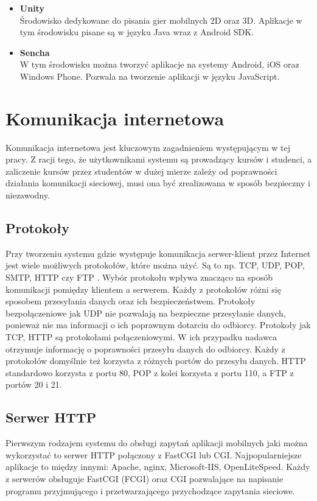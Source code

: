 \documentclass[eng]{mgr}
\begin{document}
\begin{itemize}
				\item \textbf{Unity}\\
				Środowisko dedykowane do pisania gier mobilnych 2D oraz 3D. Aplikacje w tym środowisku pisane są w języku Java wraz z Android SDK.
				
				\item \textbf{Sencha}\\
				W tym środowisku można tworzyć aplikacje na systemy Android, iOS oraz Windows Phone. Pozwala na tworzenie aplikacji w języku JavaScript.
				
			\end{itemize}
	
		\section{Komunikacja internetowa}
		Komunikacja internetowa jest kluczowym zagadnieniem występującym w tej pracy. Z racji tego, że użytkownikami systemu są prowadzący kursów i studenci, a zaliczenie kursów przez studentów w dużej mierze zależy od poprawności działania komunikacji sieciowej, musi ona być zrealizowana w sposób bezpieczny i niezawodny.
		
			\subsection{Protokoły}
			Przy tworzeniu systemu gdzie występuje komunikacja serwer-klient przez Internet jest wiele możliwych protokołów, które można użyć. Są to np. TCP, UDP, POP, SMTP, HTTP czy FTP \cite{protocols}. Wybór protokołu wpływa znacząco na sposób komunikacji pomiędzy klientem a serwerem. Każdy z protokołów różni się sposobem przesyłania danych oraz ich bezpieczeństwem. Protokoły bezpołączeniowe jak UDP nie pozwalają na bezpieczne przesyłanie danych, ponieważ nie ma informacji o ich poprawnym dotarciu do odbiorcy. Protokoły jak TCP, HTTP są protokołami połączeniowymi. W ich przypadku nadawca otrzymuje informację o poprawności przesyłu danych do odbiorcy. Każdy z protokołów domyślnie też korzysta z różnych portów do przesyłu danych. HTTP standardowo korzysta z portu 80, POP z kolei korzysta z portu 110, a FTP z portów 20 i 21.
	
			\subsection{Serwer HTTP}
			Pierwszym rodzajem systemu do obsługi zapytań aplikacji mobilnych jaki można wykorzystać to serwer HTTP połączony z FastCGI \cite{fcgi} lub CGI. Najpopularniejsze aplikacje \cite{httpserversusage} to między innymi: Apache, nginx, Microsoft-IIS, OpenLiteSpeed. Każdy z serwerów obsługuje FastCGI (FCGI) oraz CGI pozwalające na napisanie programu przyjmującego i przetwarzającego przychodzące zapytania sieciowe.\\
			
\end{document}
